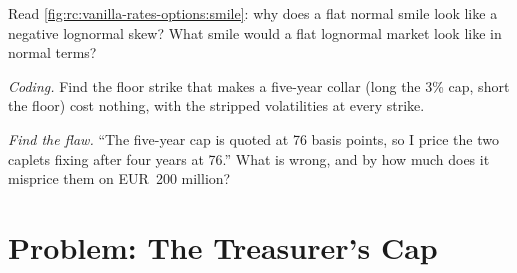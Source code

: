 \begin{exercise}[$\star\star$]\label{exo:rc:vanilla-rates-options:6}
Read \cref{fig:rc:vanilla-rates-options:smile}: why does a flat normal smile
look like a negative lognormal skew? What smile would a flat lognormal market
look like in normal terms?
\end{exercise}

\begin{exercise}[$\star\star\star$]\label{exo:rc:vanilla-rates-options:7}
\emph{Coding.} Find the floor strike that makes a five-year collar (long the 3\%
cap, short the floor) cost nothing, with the stripped volatilities at every
strike.
\end{exercise}

\begin{exercise}[$\star\star\star$]\label{exo:rc:vanilla-rates-options:8}
\emph{Find the flaw.} ``The five-year cap is quoted at 76 basis points, so I
price the two caplets fixing after four years at 76.'' What is wrong, and by
how much does it misprice them on EUR~200 million?
\end{exercise}

\section{Problem: The Treasurer's Cap}

